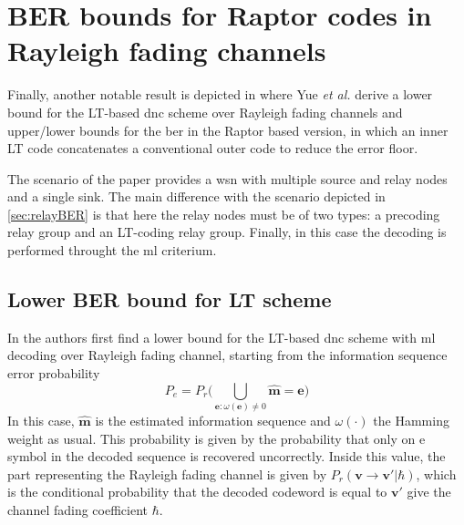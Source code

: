 \section{BER bounds for Raptor codes in Rayleigh fading channels}
Finally, another notable result is depicted in \cite{Yue2013} where Yue \textit{et al.} derive a lower bound for the LT-based \gls{dnc} scheme over Rayleigh fading channels and upper/lower bounds for the \gls{ber} in the Raptor based version, in which an inner LT code concatenates a conventional outer code to reduce the error floor.

The scenario of the paper provides a \gls{wsn} with multiple source and relay nodes and a single sink. The main difference with the scenario depicted in \autoref{sec:relayBER} is that here the relay nodes must be of two types: a precoding relay group and an LT-coding relay group. Finally, in this case the decoding is performed throught the \gls{ml} criterium.

\subsection{Lower BER bound for LT scheme}
In \cite{Yue2013} the authors first find a lower bound for the LT-based \gls{dnc} scheme with \gls{ml} decoding over Rayleigh fading channel, starting from the information sequence error probability
\begin{equation}
  P_e = P_r\biggl(\bigcup\limits_{\mathbf{e}:\omega(\mathbf{e})\neq 0}\hat{\mathbf{m} }= \mathbf{e}\biggr)
\end{equation}
In this case, $\hat{\mathbf{m}}$ is the estimated information sequence and $\omega(\cdot)$ the Hamming weight as usual. This probability is given by the probability that only on e symbol in the decoded sequence is recovered uncorrectly. Inside this value, the part representing the Rayleigh fading channel is given by $P_r(\mathbf{v}\rightarrow \mathbf{v}'|\hbar)$, which is the conditional probability that the decoded codeword is equal to $\mathbf{v}'$ give the channel fading coefficient $\hbar$.
